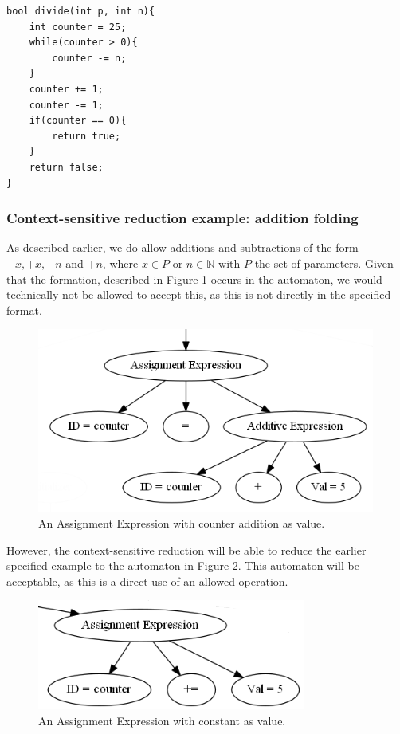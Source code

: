 \documentclass[12pt]{article}
\begin{document}
\begin{lstlisting}[style=CStyle]
bool divide(int p, int n){
	int counter = 25;
	while(counter > 0){
		counter -= n;
	}
	counter += 1;
	counter -= 1;
	if(counter == 0){
		return true;
	}
	return false;
}
\end{lstlisting}

\subsubsection{Context-sensitive reduction example: addition folding}
As described earlier, we do allow additions and subtractions of the form $-x, +x, -n$ and $+n$, where $x \in P$ or $n \in \mathbb{N}$ with $P$ the set of parameters. Given that the formation, described in Figure \ref{fig:unfolded_addition} occurs in the automaton, we would technically not be allowed to accept this, as this is not directly in the specified format.

\begin{figure}[h]
	\centering
	\includegraphics[width=0.8\linewidth]{unfolded_addition}
	\caption{An Assignment Expression with counter addition as value.}
	\label{fig:unfolded_addition}
\end{figure}

However, the context-sensitive reduction will be able to reduce the earlier specified example to the automaton in Figure \ref{fig:folded_addition}. This automaton will be acceptable, as this is a direct use of an allowed operation.

\begin{figure}[h]
	\centering
	\includegraphics[width=0.6\linewidth]{folded_addition}
	\caption{An Assignment Expression with constant as value.}
	\label{fig:folded_addition}
\end{figure}
\newpage
\end{document}
